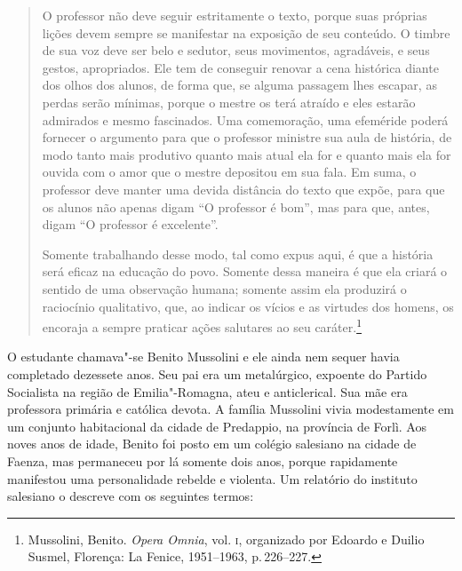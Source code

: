 \begin{quote}
O professor não deve seguir estritamente o texto, porque suas próprias
lições devem sempre se manifestar na exposição de seu conteúdo. O timbre
de sua voz deve ser belo e sedutor, seus movimentos, agradáveis, e seus
gestos, apropriados. Ele tem de conseguir renovar a cena histórica
diante dos olhos dos alunos, de forma que, se alguma passagem lhes
escapar, as perdas serão mínimas, porque o mestre os terá atraído e eles
estarão admirados e mesmo fascinados. Uma comemoração, uma efeméride
poderá fornecer o argumento para que o professor ministre sua aula de
história, de modo tanto mais produtivo quanto mais atual ela for e
quanto mais ela for ouvida com o amor que o mestre depositou em sua
fala. Em suma, o professor deve manter uma devida distância do texto que
expõe, para que os alunos não apenas digam ``O professor é bom'', mas
para que, antes, digam ``O professor é excelente''.

Somente trabalhando desse modo, tal como expus aqui, é que a história
será eficaz na educação do povo. Somente dessa maneira é que ela criará
o sentido de uma observação humana; somente assim ela produzirá o
raciocínio qualitativo, que, ao indicar os vícios e as virtudes dos
homens, os encoraja a sempre praticar ações salutares ao seu
caráter.\footnote{Mussolini, Benito. \emph{Opera Omnia}, vol. \textsc{i},
  organizado por Edoardo e Duilio Susmel, Florença: La Fenice,
  1951--1963, p.\,226--227.}
\end{quote}

O estudante chamava"-se Benito Mussolini e ele ainda nem sequer havia
completado dezessete anos. Seu pai era um metalúrgico, expoente do
Partido Socialista na região de Emilia"-Romagna, ateu e anticlerical. Sua
mãe era professora primária e católica devota. A família Mussolini vivia
modestamente em um conjunto habitacional da cidade de Predappio, na
província de Forlì. Aos noves anos de idade, Benito foi posto em um
colégio salesiano na cidade de Faenza, mas permaneceu por lá somente
dois anos, porque rapidamente manifestou uma personalidade rebelde e
violenta. Um relatório do instituto salesiano o descreve com os
seguintes termos:

